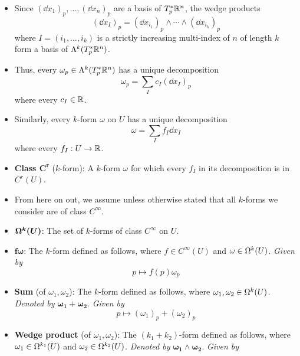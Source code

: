 \documentclass[../notes.tex]{subfiles}
\begin{document}
\begin{itemize}
\begin{itemize}
    \end{itemize}
    \item Since $(\dd x_1)_p,\dots,(\dd x_n)_p$ are a basis of $T_p^*\R^n$, the wedge products
    \begin{equation*}
        (\dd x_I)_p = (\dd x_{i_1})_p\wedge\cdots\wedge(\dd x_{i_k})_p
    \end{equation*}
    where $I=(i_1,\dots,i_k)$ is a strictly increasing multi-index of $n$ of length $k$ form a basis of $\lam[k]{T_p^*\R^n}$.
    \item Thus, every $\omega_p\in\lam[k]{T_p^*\R^n}$ has a unique decomposition
    \begin{equation*}
        \omega_p = \sum_Ic_I(\dd x_I)_p
    \end{equation*}
    where every $c_I\in\R$.
    \item Similarly, every $k$-form $\omega$ on $U$ has a unique decomposition
    \begin{equation*}
        \omega = \sum_If_I\dd{x_I}
    \end{equation*}
    where every $f_I:U\to\R$.
    \item \textbf{Class $\bm{C^r}$} ($k$-form): A $k$-form $\omega$ for which every $f_I$ in its decomposition is in $C^r(U)$.
    \item From here on out, we assume unless otherwise stated that all $k$-forms we consider are of class $C^\infty$.
    \item $\bm{\ome[k]{U}}$: The set of $k$-forms of class $C^\infty$ on $U$.
    \item $\bm{f\omega}$: The $k$-form defined as follows, where $f\in C^\infty(U)$ and $\omega\in\ome[k]{U}$. \emph{Given by}
    \begin{equation*}
        p \mapsto f(p)\omega_p
    \end{equation*}
    \item \textbf{Sum} (of $\omega_1,\omega_2$): The $k$-form defined as follows, where $\omega_1,\omega_2\in\ome[k]{U}$. \emph{Denoted by} $\bm{\omega_1+\omega_2}$. \emph{Given by}
    \begin{equation*}
        p \mapsto (\omega_1)_p+(\omega_2)_p
    \end{equation*}
    \item \textbf{Wedge product} (of $\omega_1,\omega_2$): The $(k_1+k_2)$-form defined as follows, where $\omega_1\in\ome[k_1]{U}$ and $\omega_2\in\ome[k_2]{U}$. \emph{Denoted by} $\bm{\omega_1\wedge\omega_2}$. \emph{Given by}
    \begin{equation*}

\end{equation*}
\end{itemize}
\end{document}
